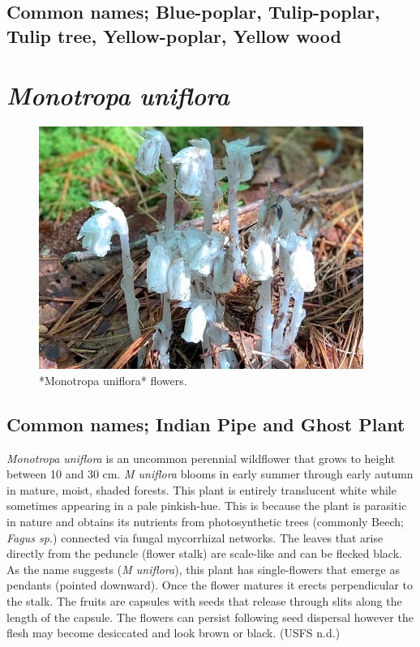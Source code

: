 \documentclass[
]{article}
\begin{document}
\hypertarget{common-names-blue-poplar-tulip-poplar-tulip-tree-yellow-poplar-yellow-wood}{%
\subsection{Common names; Blue-poplar, Tulip-poplar, Tulip tree, Yellow-poplar, Yellow wood}\label{common-names-blue-poplar-tulip-poplar-tulip-tree-yellow-poplar-yellow-wood}}

\hypertarget{monotropa-uniflora}{%
\section{\texorpdfstring{\emph{Monotropa uniflora}}{Monotropa uniflora}}\label{monotropa-uniflora}}

\begin{figure}

{\centering \includegraphics[width=0.5\linewidth]{M uniflora} 

}

\caption{*Monotropa uniflora* flowers.}\label{fig:uniflora}
\end{figure}

\hypertarget{common-names-indian-pipe-and-ghost-plant}{%
\subsection{Common names; Indian Pipe and Ghost Plant}\label{common-names-indian-pipe-and-ghost-plant}}

\emph{Monotropa uniflora} is an uncommon perennial wildflower that grows to height between 10 and 30 cm. \emph{M uniflora} blooms in early summer through early autumn in mature, moist, shaded forests. This plant is entirely translucent white while sometimes appearing in a pale pinkish-hue. This is because the plant is parasitic in nature and obtains its nutrients from photosynthetic trees (commonly Beech; \emph{Fagus sp.}) connected via fungal mycorrhizal networks. The leaves that arise directly from the peduncle (flower stalk) are scale-like and can be flecked black. As the name suggests (\emph{M uniflora}), this plant has single-flowers that emerge as pendants (pointed downward). Once the flower matures it erects perpendicular to the stalk. The fruits are capsules with seeds that release through slits along the length of the capsule. The flowers can persist following seed dispersal however the flesh may become desiccated and look brown or black. (USFS n.d.)
\end{document}

